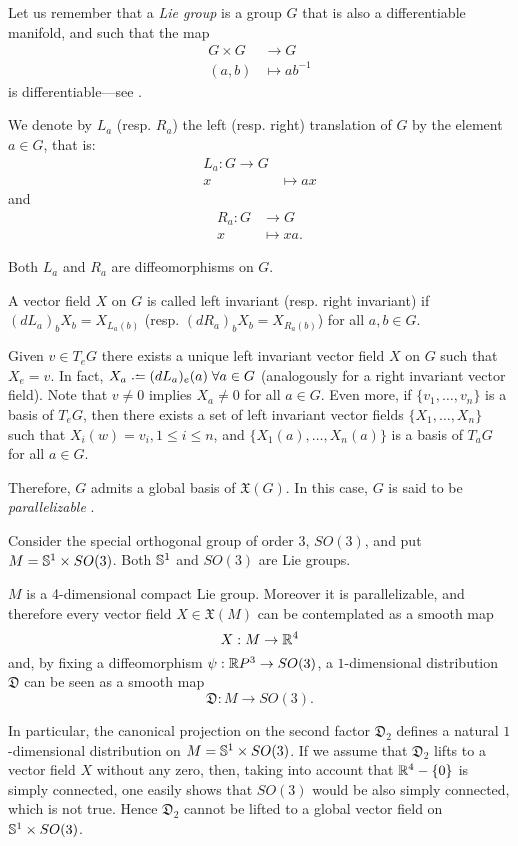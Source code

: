 \begin{remark}
	Let us remember that a \emph{Lie group} is a group $G$ that is also a differentiable manifold, and such that the map
	\begin{align*}
		G \times G &\to G \\
		(a,b) &\mapsto ab^{-1}
	\end{align*}
	is differentiable---see \cite[p. 38]{kobnom63}.
	
	We denote by $L_a$ (resp. $R_a$) the left (resp. right) translation of $G$ by the element $a\in G$, that is:
	\begin{align*}
		L_a \colon G \to G \\
		x &\mapsto ax
	\end{align*}
	and
	\begin{align*}
		R_a \colon G &\to G \\
		x &\mapsto xa.
	\end{align*}

	Both $L_a$ and $R_a$ are diffeomorphisms on $G$.
	
	A vector field $X$ on $G$ is called left invariant (resp. right invariant) if $(dL_a)_b X_b = X_{L_a(b)}$ (resp. $(dR_a)_b X_b = X_{R_a(b)}$) for all $a,b \in G$.
	
	Given $v \in T_e G$ there exists a unique left invariant vector field $X$ on $G$ such that $X_e = v$. In fact, $X_a \defeq (dL_a)_e(a) \; \forall a \in G$ (analogously for a right invariant vector field). Note that $v \neq 0$ implies $X_a \neq 0$ for all $a \in G$. Even more, if $\{v_1, \dots, v_n\}$ is a basis of $T_e G$, then there exists a set of left invariant vector fields $\{X_1, \dots, X_n\}$ such that $X_i(w) = v_i, 1 \leq i \leq n$, and  $\{X_1(a), \dots, X_n(a)\}$ is a basis of $T_a G$ for all $a \in G$.
	
	Therefore, $G$ admits a global basis of $\mathfrak{X}(G)$. In this case, $G$ is said to be \emph{parallelizable} \cite[Ch. 1, Sec. 4]{kobnom63}.
\end{remark}

Consider the special orthogonal group of order 3, $SO(3)$, and put $M=\S^{1}\times SO(3)$. Both $\S^1$ and $SO(3)$ are Lie groups.

$M$ is a 4-dimensional compact Lie group. Moreover it is parallelizable, and therefore every vector field $X\in\mathfrak{X}(M)$ can be contemplated as a smooth map $$X:M\rightarrow \R^{4}$$ and, by fixing a diffeomorphism $\psi:\R P^{3}\rightarrow SO(3)$, a $1$-dimensional distribution $\mathfrak{D}$ can be seen as a smooth map $$\mathfrak{D}:M\rightarrow SO(3).$$

In particular, the canonical projection on the second factor $\mathfrak{D}_2$ defines a natural $1$-dimensional distribution on $M=\S^{1}\times SO(3)$. If we assume that $\mathfrak{D}_2$ lifts to a vector field $X$ without any zero, then, taking into account that $\R^{4}-\{0\}$ is simply connected, one easily shows that $SO(3)$ would be also simply connected, which is not true. Hence $\mathfrak{D}_2$ cannot be lifted to a global vector field on $\S^{1}\times SO(3)$.
